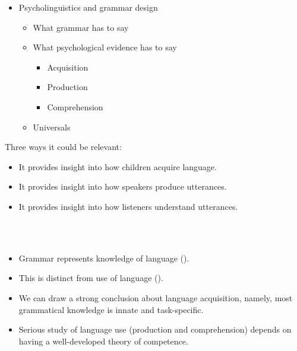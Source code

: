 \documentclass[a4paper,landscape,headrule,footrule,dvips]{foils}
\begin{document}
\avmfont{\it}
\maketitle



\begin{itemize}
\item Psycholinguistics and grammar design
  \begin{itemize}
  \item What grammar has to say
  \item What psychological evidence has to say
    \begin{itemize}
    \item Acquisition
    \item Production
    \item Comprehension
    \end{itemize}
  \item Universals
  \end{itemize}
\end{itemize}


Three ways it could be relevant:

\begin{itemize}
\item It provides insight into how children 
acquire language.
\item It provides insight into how speakers 
produce utterances. 
\item It provides insight into how listeners 
understand utterances. 
\end{itemize}


\vfill
\begin{center}\Large
  \\[3ex]
  \\[3ex]
\end{center}
\vfill
{}


\begin{itemize}
\item Grammar represents knowledge of language 
().
\item This is distinct from use of language ().
\item We can draw a strong conclusion about language 
acquisition, namely, most grammatical knowledge is 
innate and task-specific.
\item Serious study of language use (production and 
comprehension) depends on having a well-developed 
theory of competence.
\end{itemize}
\end{document}

